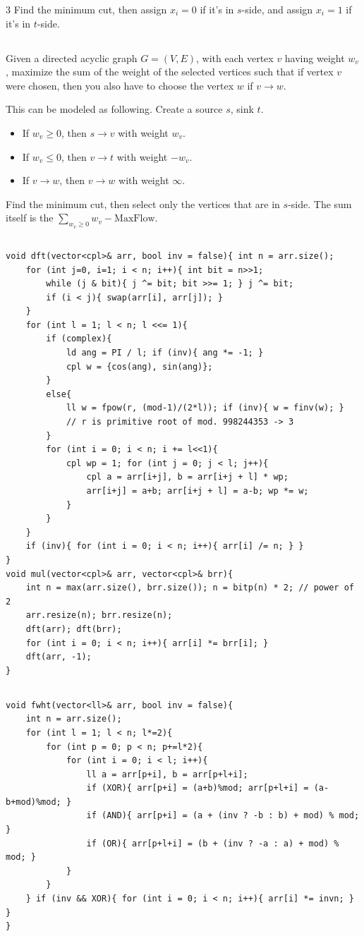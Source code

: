 \documentclass[landscape, 8pt, a4paper, oneside]{extarticle}
\begin{document}
\begin{multicols*}{3}
Find the minimum cut, then assign $x_i = 0$ if it's in $s$-side, and assign $x_i = 1$ if it's in $t$-side.
\subsection{}
Given a directed acyclic graph $G = (V, E)$, with each vertex $v$ having weight $w_v$,
maximize the sum of the weight of the selected vertices such that if vertex $v$ were chosen, then you also have to choose the vertex $w$ if $v \rightarrow w$.

This can be modeled as following. Create a source $s$, sink $t$.
\begin{itemize}
	\item If $w_v \ge 0$, then $s \to v$ with weight $w_v$.
	\item If $w_v \le 0$, then $v \to t$ with weight $-w_v$.
	\item If $v \to w$, then $v \to w$ with weight $\infty$.
\end{itemize}

Find the minimum cut, then select only the vertices that are in $s$-side.
The sum itself is the $\sum_{w_v \ge 0} w_v - \mathrm{MaxFlow}$.
\subsection{}
\begin{verbatim}
void dft(vector<cpl>& arr, bool inv = false){ int n = arr.size();
	for (int j=0, i=1; i < n; i++){ int bit = n>>1;
		while (j & bit){ j ^= bit; bit >>= 1; } j ^= bit;
		if (i < j){ swap(arr[i], arr[j]); }
	}
	for (int l = 1; l < n; l <<= 1){
		if (complex){
			ld ang = PI / l; if (inv){ ang *= -1; }
			cpl w = {cos(ang), sin(ang)};
		}
		else{
			ll w = fpow(r, (mod-1)/(2*l)); if (inv){ w = finv(w); }
			// r is primitive root of mod. 998244353 -> 3
		}
		for (int i = 0; i < n; i += l<<1){
			cpl wp = 1; for (int j = 0; j < l; j++){
				cpl a = arr[i+j], b = arr[i+j + l] * wp;
				arr[i+j] = a+b; arr[i+j + l] = a-b; wp *= w;
			}
		}
	}
	if (inv){ for (int i = 0; i < n; i++){ arr[i] /= n; } }
}
void mul(vector<cpl>& arr, vector<cpl>& brr){
	int n = max(arr.size(), brr.size()); n = bitp(n) * 2; // power of 2
	arr.resize(n); brr.resize(n);
	dft(arr); dft(brr);
	for (int i = 0; i < n; i++){ arr[i] *= brr[i]; }
	dft(arr, -1);
}
\end{verbatim}
\subsection{}
\begin{verbatim}
void fwht(vector<ll>& arr, bool inv = false){
	int n = arr.size();
	for (int l = 1; l < n; l*=2){
		for (int p = 0; p < n; p+=l*2){
			for (int i = 0; i < l; i++){
				ll a = arr[p+i], b = arr[p+l+i];
				if (XOR){ arr[p+i] = (a+b)%mod; arr[p+l+i] = (a-b+mod)%mod; }
				if (AND){ arr[p+i] = (a + (inv ? -b : b) + mod) % mod; }
				if (OR){ arr[p+l+i] = (b + (inv ? -a : a) + mod) % mod; }
			}
		}
	} if (inv && XOR){ for (int i = 0; i < n; i++){ arr[i] *= invn; } }
}
\end{verbatim}

\end{multicols*}
\end{document}
